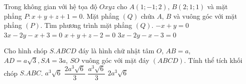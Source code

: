 \begin{ex}%
		Trong không gian với hệ tọa độ $Oxyz$ cho $A \left(1;-1;2\right)$, $ B\left(2;1;1\right)$ và mặt phẳng
		$P\colon x+y+z+1=0$. Mặt phẳng $(Q)$ chứa $A$, $B$ và vuông góc với mặt phẳng $(P)$. Tìm phương trình mặt phẳng $(Q)$.
		\choice
		{$-x+y=0$}
		{$3x-2y-x+3=0$}
		{$x+y+z-2=0$}
		{\True $3x-2y-x-3=0$}
	\end{ex}
\begin{ex}%
		Cho hình chóp $S.ABCD$ đáy là hình chữ nhật tâm $O$, $AB=a$, $AD=a\sqrt{3},SA=3a$, $SO$ vuông góc với mặt đáy $\left(ABCD\right)$. Tính thể tích khối chóp $S.ABC$.
		\choice
		{$a^3\sqrt{6}$}
		{$\dfrac{2a^3\sqrt{6}}{3}$}
		{\True $\dfrac{a^3\sqrt{6}}{3}$}
		{$2a^3\sqrt{6}$}
	\end{ex}
